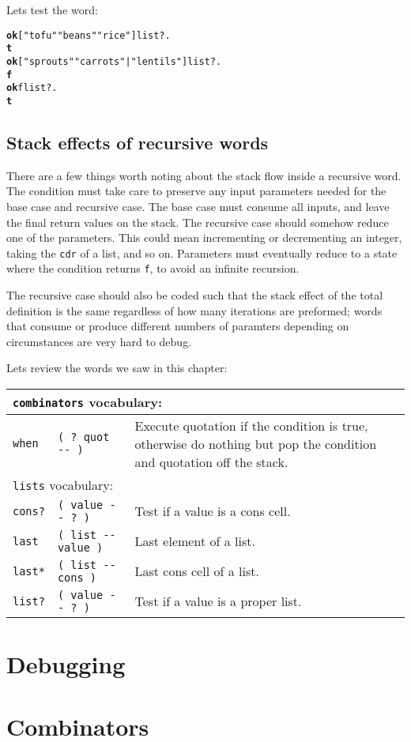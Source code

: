 \documentclass[english]{book}
\newcommand{\wordtable}[1]{{
\begin{tabularx}{12cm}{|l l X|}
#1
\hline
\end{tabularx}}}
\newcommand{\tabvocab}[1]{
\hline
\multicolumn{3}{|l|}{
\rule[-2mm]{0mm}{6mm}
\texttt{#1} vocabulary:}
\\
\hline
}
\begin{document}
Lets test the word:

\begin{alltt}
\textbf{ok} {[} "tofu" "beans" "rice" {]} list? .
\textbf{t}
\textbf{ok} {[} "sprouts" "carrots" | "lentils" {]} list? .
\textbf{f}
\textbf{ok} f list? .
\textbf{t}
\end{alltt}

\subsection{Stack effects of recursive words}

There are a few things worth noting about the stack flow inside a recursive word. The condition must take care to preserve any input parameters needed for the base case and recursive case. The base case must consume all inputs, and leave the final return values on the stack. The recursive case should somehow reduce one of the parameters. This could mean incrementing or decrementing an integer, taking the \texttt{cdr} of a list, and so on. Parameters must eventually reduce to a state where the condition returns \texttt{f}, to avoid an infinite recursion.

The recursive case should also be coded such that the stack effect of the total definition is the same regardless of how many iterations are preformed; words that consume or produce different numbers of paramters depending on circumstances are very hard to debug.

Lets review the words we saw in this chapter:

\wordtable{
\tabvocab{combinators}
\texttt{when}&
\texttt{( ?~quot -{}- )}&
Execute quotation if the condition is true, otherwise do nothing but pop the condition and quotation off the stack.\\
\tabvocab{lists}
\texttt{cons?}&
\texttt{( value -{}- ?~)}&
Test if a value is a cons cell.\\
\texttt{last}&
\texttt{( list -{}- value )}&
Last element of a list.\\
\texttt{last*}&
\texttt{( list -{}- cons )}&
Last cons cell of a list.\\
\texttt{list?}&
\texttt{( value -{}- ?~)}&
Test if a value is a proper list.\\
}

\section{Debugging}

\section{Combinators}
\end{document}
